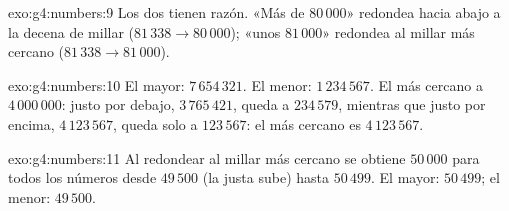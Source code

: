 \begin{solution}{exo:g4:numbers:9}
Los dos tienen razón. «Más de $80\,000$» redondea hacia abajo a la decena
de millar ($81\,338 \to 80\,000$); «unos $81\,000$» redondea al
millar más cercano ($81\,338 \to 81\,000$).
\end{solution}

\begin{solution}{exo:g4:numbers:10}
El mayor: $7\,654\,321$. El menor: $1\,234\,567$. El más cercano a
$4\,000\,000$: justo por debajo, $3\,765\,421$, queda a
$234\,579$, mientras que justo por encima, $4\,123\,567$, queda solo a
$123\,567$: el más cercano es $4\,123\,567$.
\end{solution}

\begin{solution}{exo:g4:numbers:11}
Al redondear al millar más cercano se obtiene $50\,000$ para todos los números
desde $49\,500$ (la  justa sube) hasta $50\,499$. El mayor:
$50\,499$; el menor: $49\,500$.
\end{solution}
